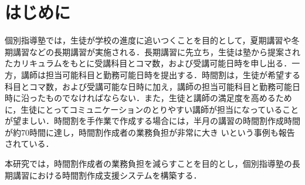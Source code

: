 \chapter{はじめに}
個別指導塾では，生徒が学校の進度に追いつくことを目的として，夏期講習や冬期講習などの長期講習が実施される．長期講習に先立ち，生徒は塾から提案されたカリキュラムをもとに受講科目とコマ数，および受講可能日時を申し出る．一方，講師は担当可能科目と勤務可能日時を提出する．時間割は，生徒が希望する科目とコマ数，および受講可能な日時に加え，講師の担当可能科目と勤務可能日時に沿ったものでなければならない．また，生徒と講師の満足度を高めるために，生徒にとってコミュニケーションのとりやすい講師が担当になっていることが望ましい．時間割を手作業で作成する場合には，半月の講習の時間割作成時間が約70時間に達し，時間割作成者の業務負担が非常に大き
いという事例も報告されている．

本研究では，時間割作成者の業務負担を減らすことを目的とし，個別指導塾の長期講習における時間割作成支援システムを構築する．




